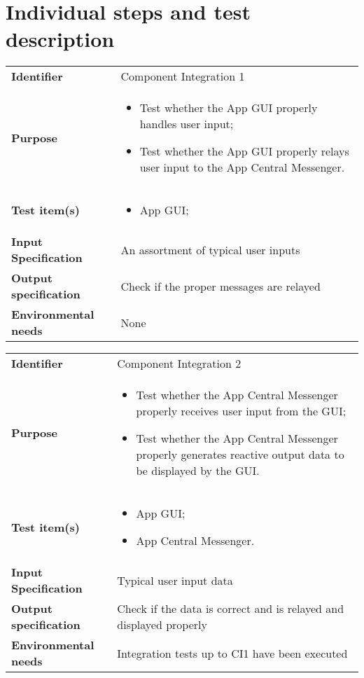 \chapter{Individual steps and test description}


\begin{center}
\begin{tabular}{lp{}}
\toprule
\textbf{Identifier}		&	Component Integration 1\\
\textbf{Purpose}		&	\begin{itemize}
					\item Test whether the App GUI properly handles user input;
					\item Test whether the App GUI properly relays user input to the App Central Messenger.
					\end{itemize}	\\
\textbf{Test item(s)}	&	\begin{itemize}
					\item App GUI;
					\end{itemize}	\\
\textbf{Input Specification}	&	An assortment of typical user inputs\\
\textbf{Output specification}	&	Check if the proper messages are relayed\\
\textbf{Environmental needs}	&	None\\
\bottomrule
\end{tabular}
\end{center}


\begin{center}
\begin{tabular}{lp{}}
\toprule
\textbf{Identifier}		&	Component Integration 2\\
\textbf{Purpose}		&	\begin{itemize}
					\item Test whether the App Central Messenger properly receives user input from the GUI;
					\item Test whether the App Central Messenger properly generates reactive output data to be displayed by the GUI.
					\end{itemize}	\\
\textbf{Test item(s)}	&	\begin{itemize}
					\item App GUI;
					\item App Central Messenger.
					\end{itemize}	\\
\textbf{Input Specification}	&	Typical user input data\\
\textbf{Output specification}	&	Check if the data is correct and is relayed and displayed properly\\
\textbf{Environmental needs}	&	Integration tests up to CI1 have been executed\\
\bottomrule
\end{tabular}
\end{center}

